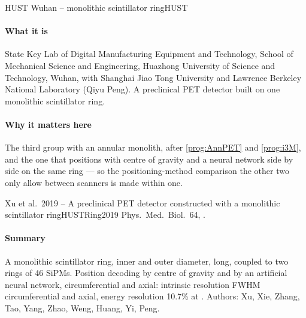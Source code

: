 
\begin{programnote}{HUST Wuhan -- monolithic scintillator ring}{HUST}

\paragraph{What it is}
State Key Lab of Digital Manufacturing Equipment and Technology, School of
Mechanical Science and Engineering, Huazhong University of Science and
Technology, Wuhan, with Shanghai Jiao Tong University and Lawrence Berkeley
National Laboratory (Qiyu Peng). A preclinical PET detector built on one
monolithic scintillator ring.

\paragraph{Why it matters here}
The third group with an annular monolith, after \ref{prog:AnnPET} and
\ref{prog:i3M}, and the one that positions with centre of gravity and a
neural network side by side on the same ring --- so the positioning-method
comparison the other two only allow between scanners is made within one.

\begin{papernote}{Xu et al.\ 2019 -- A preclinical PET detector constructed with a monolithic scintillator ring}{HUSTRing2019}
Phys.\ Med.\ Biol.\ 64, .

\paragraph{Summary}
A monolithic scintillator ring,  inner and  outer diameter,
 long, coupled to two rings of 46 SiPMs. Position decoding by centre
of gravity and by an artificial neural network, circumferential and axial:
intrinsic resolution  FWHM circumferential and  axial,
energy resolution 10.7\% at . Authors: Xu, Xie, Zhang, Tao, Yang,
Zhao, Weng, Huang, Yi, Peng.

\end{papernote}

\end{programnote}


